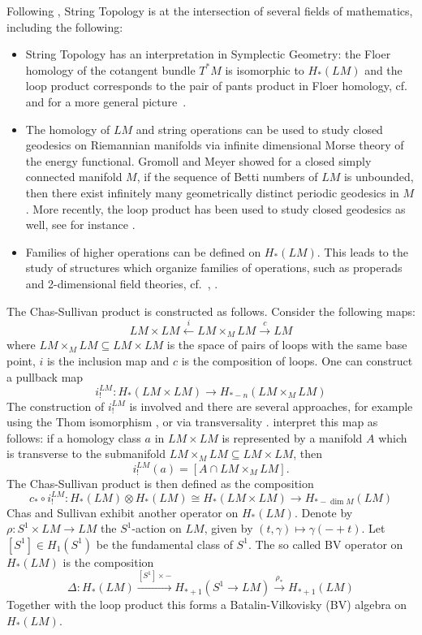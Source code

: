 \documentclass{scrartcl}
\theoremstyle{plain}
\theoremstyle{definition}
\renewcommand{\subset}{\subseteq}
\newcommand{\isect}{\mathbin{\cap}}
\newcommand{\iso}{\cong}
\let\xto\xrightarrow
\let\xfrom\xleftarrow
\newcommand{\blank}{-}
\newcommand{\comp}{\mathbin{\circ}}
\begin{document}
Following \cite[Sec. 1]{naef2022string}, String Topology is at the intersection of several fields of mathematics, including the following: 
\begin{itemize}
    \item String Topology has an interpretation in Symplectic Geometry: the Floer homology of the cotangent bundle $T^*M$ is isomorphic to $H_*(LM)$ and the loop product corresponds to the pair of pants product in Floer homology, cf.~\cite{abbondandolo2010floer} and for a more general picture~\cite{cieliebak2009role}. 
    \item The homology of $LM$ and string operations can be used to study closed geodesics on Riemannian manifolds via infinite dimensional Morse theory of the energy functional. Gromoll and Meyer \cite{gromoll1969periodic} showed for a closed simply connected manifold $M$, if the sequence of Betti numbers of $LM$ is unbounded, then there exist infinitely many geometrically distinct periodic geodesics in $M$. More recently, the loop product has been used to study closed geodesics as well, see for instance \cite{Goresky_2009}. 
    \item Families of higher operations can be defined on $H_*(LM)$. This leads to the study of structures which organize families of operations, such as properads and 2-dimensional field theories, cf.~\cite{godin2007higher}, \cite[I.2, I.3]{cohen2006string}.
\end{itemize}

The Chas-Sullivan product is constructed as follows. Consider the following maps: $$LM\times LM \xfrom{i} LM\times_M LM \xto{c} LM$$
where $LM\times_M LM\subset LM\times LM$ is the space of pairs of loops with the same base point, $i$ is the inclusion map and $c$ is the composition of loops. One can construct a pullback map $$i_!^{LM}\colon H_*(LM\times LM)\to H_{*-n}(LM\times_M LM)$$
The construction of $i_!^{LM}$ is involved and there are several approaches, for example using the Thom isomorphism \cite{cohen2006string}, \cite{hingston2017product} or via transversality \cite{chataur2005bordism}. \cite{chas1999string} interpret this map as follows: if a homology class $a$ in $LM\times LM$ is represented by a manifold $A$ which is transverse to the submanifold $LM\times_M LM\subset LM\times LM$, then $$i_!^{LM}(a) = [A\isect LM\times_M LM].$$ The Chas-Sullivan product is then defined as the composition $$c_*\comp i_!^{LM}\colon H_*(LM)\otimes H_*(LM)\iso H_*(LM\times LM)\to H_{*-\dim M}(LM)$$
Chas and Sullivan exhibit another operator on $H_*(LM)$. Denote by $\rho\colon S^1\times LM\to LM$ the $S^1$-action on $LM$, given by $(t,\gamma)\mapsto \gamma(\blank+t)$. Let $[S^1]\in H_1(S^1)$ be the fundamental class of $S^1$. The so called BV operator on $H_*(LM)$ is the composition 
$$\Delta\colon H_*(LM)\xto{[S^1]\times \blank} H_{*+1}(S^{1}\to LM)\xto{\rho_*} H_{*+1}(LM)$$
Together with the loop product this forms a Batalin-Vilkovisky (BV) algebra on $H_*(LM)$. 
\end{document}
